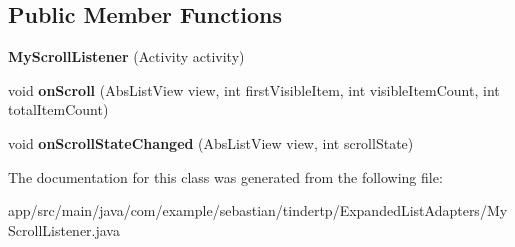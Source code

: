 \subsection*{Public Member Functions}
\begin{DoxyCompactItemize}
\item 
{\bfseries My\+Scroll\+Listener} (Activity activity)\hypertarget{classcom_1_1example_1_1sebastian_1_1tindertp_1_1ExpandedListAdapters_1_1MyScrollListener_a7167715f176a6224cea4ef356a941343}{}\label{classcom_1_1example_1_1sebastian_1_1tindertp_1_1ExpandedListAdapters_1_1MyScrollListener_a7167715f176a6224cea4ef356a941343}

\item 
void {\bfseries on\+Scroll} (Abs\+List\+View view, int first\+Visible\+Item, int visible\+Item\+Count, int total\+Item\+Count)\hypertarget{classcom_1_1example_1_1sebastian_1_1tindertp_1_1ExpandedListAdapters_1_1MyScrollListener_a7590e468791860c49426565e73cd3997}{}\label{classcom_1_1example_1_1sebastian_1_1tindertp_1_1ExpandedListAdapters_1_1MyScrollListener_a7590e468791860c49426565e73cd3997}

\item 
void {\bfseries on\+Scroll\+State\+Changed} (Abs\+List\+View view, int scroll\+State)\hypertarget{classcom_1_1example_1_1sebastian_1_1tindertp_1_1ExpandedListAdapters_1_1MyScrollListener_af8ec098054bb04524f898103f6c6ed3d}{}\label{classcom_1_1example_1_1sebastian_1_1tindertp_1_1ExpandedListAdapters_1_1MyScrollListener_af8ec098054bb04524f898103f6c6ed3d}

\end{DoxyCompactItemize}


The documentation for this class was generated from the following file\+:\begin{DoxyCompactItemize}
\item 
app/src/main/java/com/example/sebastian/tindertp/\+Expanded\+List\+Adapters/My\+Scroll\+Listener.\+java\end{DoxyCompactItemize}
